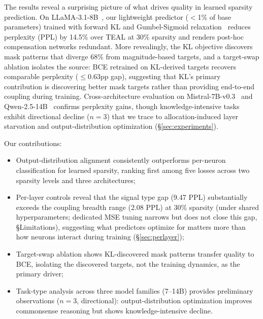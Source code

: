 The results reveal a surprising picture of what drives quality in learned sparsity prediction.
On LLaMA-3.1-8B~\cite{grattafiori2024llama3}, our lightweight predictor ($<$1\% of base parameters) trained with forward KL and Gumbel-Sigmoid relaxation~\cite{jang2017gumbel} reduces perplexity (PPL) by 14.5\% over TEAL at 30\% sparsity and renders post-hoc compensation networks redundant.
More revealingly, the KL objective discovers mask patterns that diverge 68\% from magnitude-based targets, and a target-swap ablation isolates the source: BCE retrained on KL-derived targets recovers comparable perplexity ($\leq$0.63pp gap), suggesting that KL's primary contribution is discovering better mask targets rather than providing end-to-end coupling during training.
Cross-architecture evaluation on Mistral-7B-v0.3~\cite{jiang2023mistral} and Qwen-2.5-14B~\cite{qwen2024qwen25} confirms perplexity gains, though knowledge-intensive tasks exhibit directional decline ($n{=}3$) that we trace to allocation-induced layer starvation and output-distribution optimization (\S\ref{sec:experiments}).

Our contributions:
\begin{itemize}[nosep,leftmargin=*]
\item Output-distribution alignment consistently outperforms per-neuron classification for learned sparsity, ranking first among five losses across two sparsity levels and three architectures;
\item Per-layer controls reveal that the signal type gap (9.47 PPL) substantially exceeds the coupling breadth range (2.08 PPL) at 30\% sparsity (under shared hyperparameters; dedicated MSE tuning narrows but does not close this gap, \S Limitations), suggesting what predictors optimize for matters more than how neurons interact during training (\S\ref{sec:perlayer});
\item Target-swap ablation shows KL-discovered mask patterns transfer quality to BCE, isolating the discovered targets, not the training dynamics, as the primary driver;
\item Task-type analysis across three model families (7--14B) provides preliminary observations ($n{=}3$, directional): output-distribution optimization improves commonsense reasoning but shows knowledge-intensive decline.
\end{itemize}

